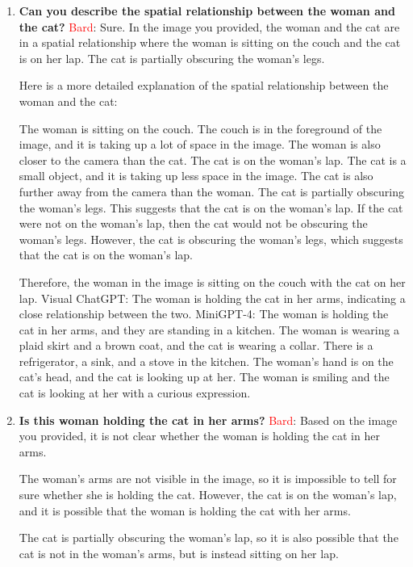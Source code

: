 \begin{enumerate}
    \item \textbf{Can you describe the spatial relationship between the woman and the cat?}
    \subitem \textcolor{Red}{Bard}: 
    Sure. In the image you provided, the woman and the cat are in a spatial relationship where the woman is sitting on the couch and the cat is on her lap. The cat is partially obscuring the woman's legs.
    
    Here is a more detailed explanation of the spatial relationship between the woman and the cat:
    
    The woman is sitting on the couch. The couch is in the foreground of the image, and it is taking up a lot of space in the image. The woman is also closer to the camera than the cat.
    The cat is on the woman's lap. The cat is a small object, and it is taking up less space in the image. The cat is also further away from the camera than the woman.
    The cat is partially obscuring the woman's legs. This suggests that the cat is on the woman's lap.
    If the cat were not on the woman's lap, then the cat would not be obscuring the woman's legs. However, the cat is obscuring the woman's legs, which suggests that the cat is on the woman's lap.
    
    Therefore, the woman in the image is sitting on the couch with the cat on her lap.
    \subitem Visual ChatGPT: The woman is holding the cat in her arms, indicating a close relationship between the two.
    \subitem MiniGPT-4: The woman is holding the cat in her arms, and they are standing in a kitchen. The woman is wearing a plaid skirt and a brown coat, and the cat is wearing a collar. There is a refrigerator, a sink, and a stove in the kitchen. The woman’s hand is on the cat’s head, and the cat is looking up at her. The woman is smiling and the cat is looking at her with a curious expression.
    \item \textbf{Is this woman holding the cat in her arms?}
    \subitem \textcolor{Red}{Bard}: 
    Based on the image you provided, it is not clear whether the woman is holding the cat in her arms.
    
    The woman's arms are not visible in the image, so it is impossible to tell for sure whether she is holding the cat. However, the cat is on the woman's lap, and it is possible that the woman is holding the cat with her arms.
    
    The cat is partially obscuring the woman's lap, so it is also possible that the cat is not in the woman's arms, but is instead sitting on her lap.
    

\end{enumerate}
